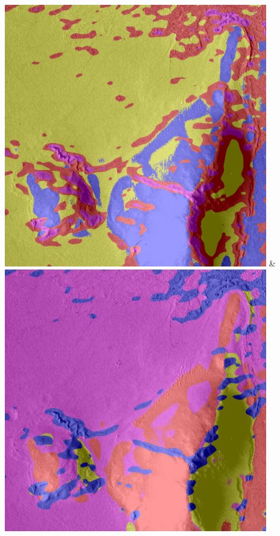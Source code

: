 \begin{table}[h!]
\begin{tabularx}{\textwidth}
		\includegraphics[width=0.9\linewidth]{images/gen/filter_size/p03_04.png_1.25.png} &
		\includegraphics[width=0.9\linewidth]{images/gen/filter_size/p03_04.png_1.50.png} \\
		\bottomrule
	\end{tabularx}
	\caption{Vergleich verschiedener Skalierungen der MR-Filterbank auf Bildern der Marsoberfläche. Die Farben der jeweiligen Cluster wurden zufällig gewählt und sagen nichts über deren Inhalt aus. Alle Bilder wurden in vier Cluster eingeteilt.}
	\label{tab:filterbank_sizes}
\end{table}


